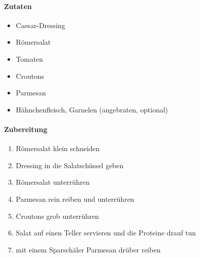 \newpage
{}
\paragraph{Zutaten}
\begin{itemize}[noitemsep]
	\item Caesar-Dressing
	\item Römersalat
	\item Tomaten
	\item Croutons
	\item Parmesan
	\item Hähnchenfleisch, Garnelen (angebraten, optional)
\end{itemize}
\paragraph{Zubereitung}
\begin{enumerate}[noitemsep]
	\item Römersalat klein schneiden
	\item Dressing in die Salatschüssel geben
	\item Römersalat unterrühren 
	\item Parmesan rein reiben und unterrühren
	\item Croutons grob unterrühren
	\item Salat auf einen Teller servieren und die Proteine drauf tun
	\item mit einem Sparschäler Parmesan drüber reiben
\end{enumerate}